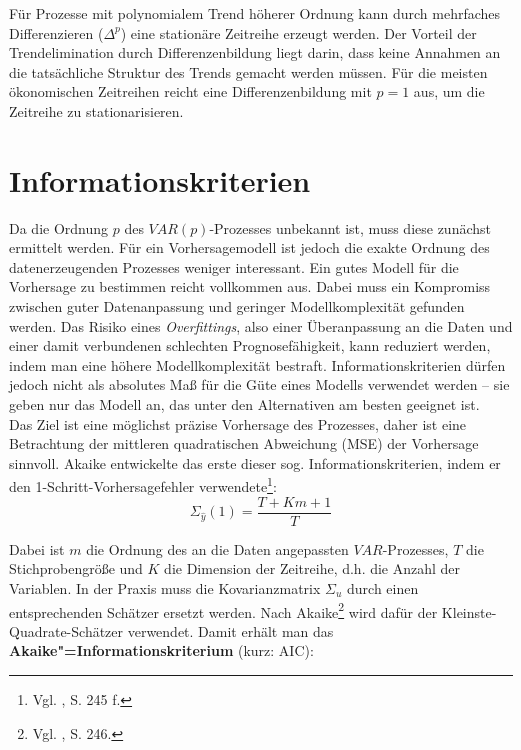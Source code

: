 \documentclass[
	a4paper,
	12pt,
	bibliography=totocnumbered,
	twoside,
]{scrreprt}
\begin{document}
Für Prozesse mit polynomialem Trend höherer Ordnung kann durch mehrfaches Differenzieren ($\Delta^p$) eine stationäre Zeitreihe erzeugt werden. Der Vorteil der Trendelimination durch Differenzenbildung liegt darin, dass keine Annahmen an die tatsächliche Struktur des Trends gemacht werden müssen. Für die meisten ökonomischen Zeitreihen reicht eine Differenzenbildung mit $p=1$ aus, um die Zeitreihe zu stationarisieren.\\





\section{Informationskriterien}
\label{sec:information-criteria}
Da die Ordnung $p$ des $VAR(p)$-Prozesses unbekannt ist, muss diese zunächst ermittelt werden. Für ein Vorhersagemodell ist jedoch die exakte Ordnung des datenerzeugenden Prozesses weniger interessant. Ein gutes Modell für die Vorhersage zu bestimmen reicht vollkommen aus. Dabei muss ein Kompromiss zwischen guter Datenanpassung und geringer Modellkomplexität gefunden werden. Das Risiko eines \textit{Overfittings}, also einer Überanpassung an die Daten und einer damit verbundenen schlechten Prognosefähigkeit, kann reduziert werden, indem man eine höhere Modellkomplexität bestraft. Informationskriterien dürfen jedoch nicht als absolutes Maß für die Güte eines Modells verwendet werden -- sie geben nur das Modell an, das unter den Alternativen am besten geeignet ist. \\

Das Ziel ist eine möglichst präzise Vorhersage des Prozesses, daher ist eine Betrachtung der mittleren quadratischen Abweichung (MSE) der Vorhersage sinnvoll. Akaike entwickelte das erste dieser sog. Informationskriterien, indem er den 1-Schritt-Vorhersagefehler verwendete\footnote{Vgl. \citet{akaike1969}, S. 245 f.}:\begin{equation}
\Sigma_{\hat{y}}(1) = \frac{T+Km+1}{T}
\end{equation}

Dabei ist $m$ die Ordnung des an die Daten angepassten $VAR$-Prozesses, $T$ die Stichprobengröße und $K$ die Dimension der Zeitreihe, d.h. die Anzahl der Variablen. In der Praxis muss die Kovarianzmatrix $\Sigma_u$ durch einen entsprechenden Schätzer ersetzt werden. Nach Akaike\footnote{Vgl. \citet{akaike1969}, S. 246.} wird dafür der Kleinste-Quadrate-Schätzer verwendet. Damit erhält man das \textbf{Akaike"=Informationskriterium} (kurz: AIC):
\clearpage
\end{document}
